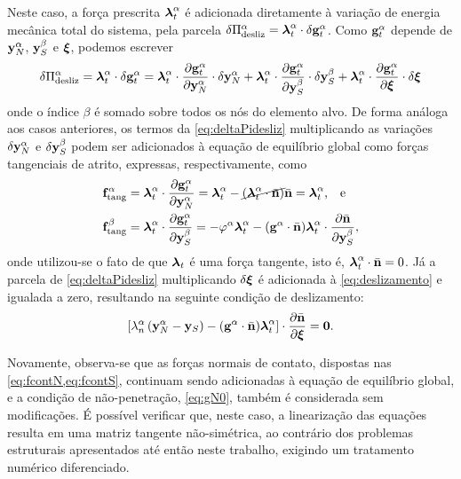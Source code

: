 \documentclass[Tese.tex]{subfiles}
\begin{document}
Neste caso, a força prescrita $\boldsymbol{\lambda}_t^\alpha$ é adicionada diretamente à variação de energia mecânica total do sistema, pela parcela $\delta\Pi_\text{desliz}^\alpha = \boldsymbol{\lambda}_t^\alpha\cdot\delta\mathbf{g}_t^\alpha$. Como $\mathbf{g}_t^\alpha$ depende de $\mathbf{y}_N^\alpha$, $\mathbf{y}_S^\beta$ e $\boldsymbol{\xi}$, podemos escrever
\begin{equation}\label{eq:deltaPidesliz}
\delta\Pi_\text{desliz}^\alpha = \boldsymbol{\lambda}_t^\alpha\cdot \delta\mathbf{g}_t^\alpha = \boldsymbol{\lambda}_t^\alpha\cdot \dfrac{\partial \mathbf{g}_t^\alpha}{\partial \mathbf{y}_N^\alpha}\cdot \delta \mathbf{y}_N^\alpha + \boldsymbol{\lambda}_t^\alpha\cdot \dfrac{\partial \mathbf{g}_t^\alpha}{\partial \mathbf{y}_S^\beta}\cdot \delta\mathbf{y}_S^\beta + \boldsymbol{\lambda}_t^\alpha\cdot \dfrac{\partial \mathbf{g}_t^\alpha}{\partial \boldsymbol{\xi}}\cdot \delta\boldsymbol{\xi}
\end{equation}
onde o índice $\beta$ é somado sobre todos os nós do elemento alvo. De forma análoga aos casos anteriores, os termos da \cref{eq:deltaPidesliz} multiplicando as variações $\delta\mathbf{y}_N^\alpha$ e $\delta\mathbf{y}_S^\beta$ podem ser adicionados à equação de equilíbrio global como forças tangenciais de atrito, expressas, respectivamente, como
\begin{align}
&\mathbf{f}_\text{tang}^\alpha = \boldsymbol{\lambda}_t^\alpha\cdot \dfrac{\partial \mathbf{g}_t^\alpha}{\partial \mathbf{y}_N^\alpha} = \boldsymbol{\lambda}_t^\alpha - \cancel{\left(\boldsymbol{\lambda}_t^\alpha\cdot \bar{\mathbf{n}}\right)}\bar{\mathbf{n}} = \boldsymbol{\lambda}_t^\alpha \text{,\quad e} \label{eq:ftangdeslN}\\
&\mathbf{f}_\text{tang}^\beta = \boldsymbol{\lambda}_t^\alpha\cdot \dfrac{\partial \mathbf{g}_t^\alpha}{\partial \mathbf{y}_S^\beta} = -\varphi^\alpha\boldsymbol{\lambda}_t^\alpha - (\mathbf{g}^\alpha\cdot \bar{\mathbf{n}})\boldsymbol{\lambda}_t^\alpha\cdot \dfrac{\partial\bar{\mathbf{n}}}{\partial\mathbf{y}_S^\beta}, \label{eq:ftangdeslS}
\end{align}
onde utilizou-se o fato de que $\boldsymbol{\lambda}_t$ é uma força tangente, isto é, $\boldsymbol{\lambda}_t^\alpha\cdot\bar{\mathbf{n}} = 0$. Já a parcela de \cref{eq:deltaPidesliz} multiplicando $\delta\boldsymbol{\xi}$ é adicionada à \cref{eq:deslizamento} e igualada a zero, resultando na seguinte condição de deslizamento:
\begin{equation}\label{eq:deslizamento-atrito}
\left[\lambda_n^\alpha\left(\mathbf{y}_N^\alpha-\mathbf{y}_S\right) - (\mathbf{g}^\alpha\cdot \bar{\mathbf{n}})\boldsymbol{\lambda}_t^\alpha\right]\cdot\dfrac{\partial\bar{\mathbf{n}}}{\partial\boldsymbol{\xi}} = \mathbf{0}.
\end{equation}

Novamente, observa-se que as forças normais de contato, dispostas nas \cref{eq:fcontN,eq:fcontS}, continuam sendo adicionadas à equação de equilíbrio global, e a condição de não-penetração, \cref{eq:gN0}, também é considerada sem modificações. É possível verificar que, neste caso, a linearização das equações resulta em uma matriz tangente não-simétrica, ao contrário dos problemas estruturais apresentados até então neste trabalho, exigindo um tratamento numérico diferenciado.
\end{document}
